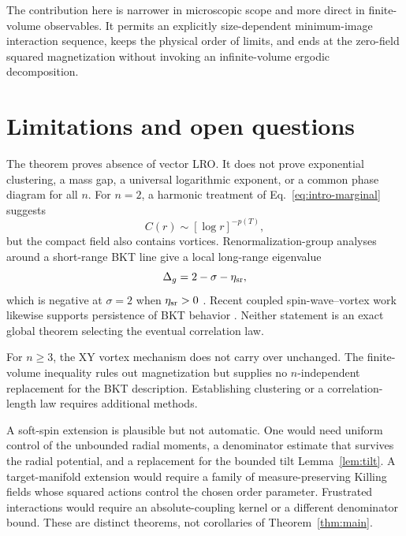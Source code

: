 \documentclass[aps,prb,twocolumn,groupedaddress,amsmath,amssymb,
               superscriptaddress,nofootinbib,floatfix]{revtex4-2}
\theoremstyle{plain}
\theoremstyle{definition}
\begin{document}
The contribution here is narrower in microscopic scope and more direct in
finite-volume observables.  It permits an explicitly size-dependent
minimum-image interaction sequence, keeps the physical order of limits, and
ends at the zero-field squared magnetization without invoking an
infinite-volume ergodic decomposition.

\section{Limitations and open questions}
\label{sec:limitations}

The theorem proves absence of vector LRO.  It does not prove exponential
clustering, a mass gap, a universal logarithmic exponent, or a common phase
diagram for all $n$.  For $n=2$, a harmonic treatment of
Eq.~\eqref{eq:intro-marginal} suggests
\begin{equation}
 C(r)\sim[\log r]^{-p(T)},                              \label{eq:spin-wave-log}
\end{equation}
but the compact field also contains vortices.  Renormalization-group
analyses around a short-range BKT line give a local long-range eigenvalue
\begin{equation}
 \Delta_g=2-\sigma-\eta_{\rm sr},                       \label{eq:rg-eigenvalue}
\end{equation}
which is negative at $\sigma=2$ when $\eta_{\rm sr}>0$
\cite{Giachetti2021}.  Recent coupled spin-wave--vortex work likewise
supports persistence of BKT behavior \cite{Walther2026}.  Neither statement
is an exact global theorem selecting the eventual correlation law.

For $n\ge3$, the XY vortex mechanism does not carry over unchanged.  The
finite-volume inequality rules out magnetization but supplies no
$n$-independent replacement for the BKT description.  Establishing
clustering or a correlation-length law requires additional methods.

A soft-spin extension is plausible but not automatic.  One would need
uniform control of the unbounded radial moments, a denominator estimate that
survives the radial potential, and a replacement for the bounded tilt
Lemma~\ref{lem:tilt}.  A target-manifold extension would require a family of
measure-preserving Killing fields whose squared actions control the chosen
order parameter.  Frustrated interactions would require an absolute-coupling
kernel or a different denominator bound.  These are distinct theorems, not
corollaries of Theorem~\ref{thm:main}.
\end{document}
